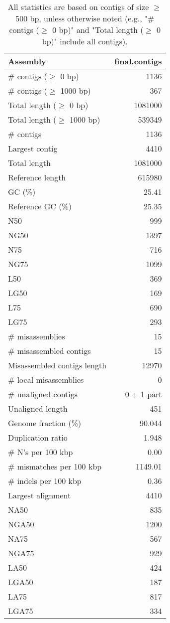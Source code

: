 \documentclass[12pt,a4paper]{article}
\begin{document}
\begin{table}[ht]
\begin{center}
\caption{All statistics are based on contigs of size $\geq$ 500 bp, unless otherwise noted (e.g., "\# contigs ($\geq$ 0 bp)" and "Total length ($\geq$ 0 bp)" include all contigs).}
\begin{tabular}{|l*{1}{|r}|}
\hline
Assembly & final.contigs \\ \hline
\# contigs ($\geq$ 0 bp) & 1136 \\ \hline
\# contigs ($\geq$ 1000 bp) & 367 \\ \hline
Total length ($\geq$ 0 bp) & 1081000 \\ \hline
Total length ($\geq$ 1000 bp) & 539349 \\ \hline
\# contigs & 1136 \\ \hline
Largest contig & 4410 \\ \hline
Total length & 1081000 \\ \hline
Reference length & 615980 \\ \hline
GC (\%) & 25.41 \\ \hline
Reference GC (\%) & 25.35 \\ \hline
N50 & 999 \\ \hline
NG50 & 1397 \\ \hline
N75 & 716 \\ \hline
NG75 & 1099 \\ \hline
L50 & 369 \\ \hline
LG50 & 169 \\ \hline
L75 & 690 \\ \hline
LG75 & 293 \\ \hline
\# misassemblies & 15 \\ \hline
\# misassembled contigs & 15 \\ \hline
Misassembled contigs length & 12970 \\ \hline
\# local misassemblies & 0 \\ \hline
\# unaligned contigs & 0 + 1 part \\ \hline
Unaligned length & 451 \\ \hline
Genome fraction (\%) & 90.044 \\ \hline
Duplication ratio & 1.948 \\ \hline
\# N's per 100 kbp & 0.00 \\ \hline
\# mismatches per 100 kbp & 1149.01 \\ \hline
\# indels per 100 kbp & 0.36 \\ \hline
Largest alignment & 4410 \\ \hline
NA50 & 835 \\ \hline
NGA50 & 1200 \\ \hline
NA75 & 567 \\ \hline
NGA75 & 929 \\ \hline
LA50 & 424 \\ \hline
LGA50 & 187 \\ \hline
LA75 & 817 \\ \hline
LGA75 & 334 \\ \hline
\end{tabular}
\end{center}
\end{table}
\end{document}
